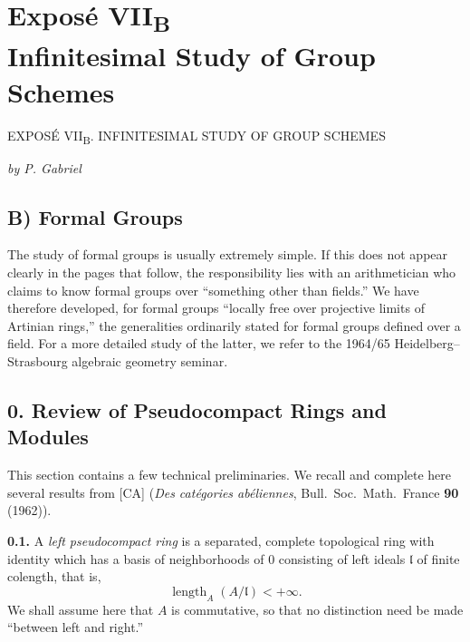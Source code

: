 
\chapter*{Expos\'e \texorpdfstring{VII\textsubscript{B}}{VII-B}\\
Infinitesimal Study of Group Schemes}
\label{sga3:VIIB:title}
%
  {EXPOS\'E VII\textsubscript{B}. INFINITESIMAL STUDY OF GROUP SCHEMES}

\begin{center}
  \textit{by P. Gabriel}
\end{center}

\section*{B) Formal Groups}
\label{sga3:VIIB:B}

\noindent
The study of formal groups is usually extremely simple. If this does not
appear clearly in the pages that follow, the responsibility lies with an
arithmetician who claims to know formal groups over ``something other than
fields.''
We have therefore developed, for formal groups ``locally free over
projective limits of Artinian rings,'' the generalities ordinarily stated
for formal groups defined over a field. For a more detailed study of the
latter, we refer to the 1964/65 Heidelberg--Strasbourg algebraic geometry
seminar.

\section*{0. Review of Pseudocompact Rings and Modules}
\label{sga3:VIIB:0}

This section contains a few technical preliminaries. We recall and
complete here several results from \textup{[CA]} (\emph{Des cat\'egories
ab\'eliennes}, Bull.\ Soc.\ Math.\ France \textbf{90} (1962)).

\medskip
\noindent\textbf{0.1.}
\label{sga3:VIIB:0.1}
A \emph{left pseudocompact ring} is a separated, complete topological
ring with identity which has a basis of neighborhoods of \(0\) consisting
of left ideals \(\mathfrak l\) of finite colength, that is,
\[
  \operatorname{length}_A(A/\mathfrak l)<+\infty.
\]
We shall assume here that \(A\) is commutative, so that no distinction
need be made ``between left and right.''


